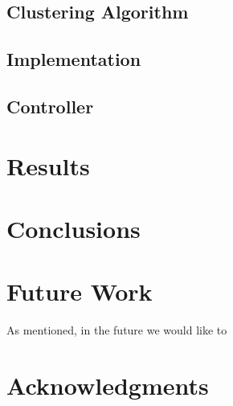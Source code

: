\documentclass{sig-alternate}
\begin{document}
\subsection{Clustering Algorithm}

\subsection{Implementation}

\subsection{Controller}

\section{Results}

\section{Conclusions}

\section{Future Work}
As mentioned, in the future we would like to 

\section{Acknowledgments}

\cite{salas:calculus}

%

\end{document}

